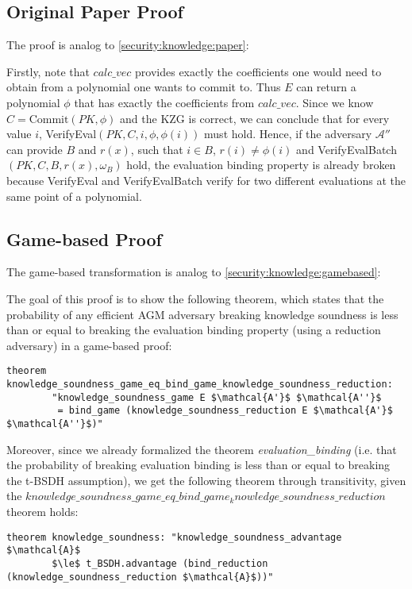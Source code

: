 \subsection*{Original Paper Proof}
\label{batch:security:knowledge:paper}
The proof is analog to \ref{security:knowledge:paper}:

Firstly, note that $calc\_vec$ provides exactly the coefficients one would need to obtain from a polynomial one wants to commit to. Thus $E$ can return a polynomial $\phi$ that has exactly the coefficients from $calc\_vec$. Since we know $C= \text{Commit}(PK, \phi)$ and the KZG is correct, we can conclude that for every value $i$, VerifyEval$(PK, C, i, \phi, \phi(i))$ must hold. Hence, if the adversary $\mathcal{A''}$ can provide $B$ and $r(x)$, such that $i\in B$, $r(i)\ne\phi(i)$
and VerifyEvalBatch$(PK, C, B, r(x), \omega_B)$ hold, the evaluation binding property is already broken because VerifyEval and VerifyEvalBatch verify for two different evaluations at the same point of a polynomial.

\subsection*{Game-based Proof}
\label{batch:security:knowledge:gamebased}

The game-based transformation is analog to \ref{security:knowledge:gamebased}:

The goal of this proof is to show the following theorem, which states that the probability of any efficient AGM adversary breaking  knowledge soundness is less than or equal to breaking the evaluation binding property (using a reduction adversary) in a game-based proof:
\begin{lstlisting}[language=isabelle]
    theorem knowledge_soundness_game_eq_bind_game_knowledge_soundness_reduction: 
        "knowledge_soundness_game E $\mathcal{A'}$ $\mathcal{A''}$ 
         = bind_game (knowledge_soundness_reduction E $\mathcal{A'}$ $\mathcal{A''}$)"
\end{lstlisting}
Moreover, since we already formalized the theorem \textit{evaluation\_binding} (i.e. that the probability of breaking evaluation binding is less than or equal to breaking the t-BSDH assumption), we get the following theorem through transitivity, given the $knowledge\_soundness\_game\_eq\_bind\_game_knowledge\_soundness\_reduction$ theorem holds: 

\begin{lstlisting}[language=isabelle]
    theorem knowledge_soundness: "knowledge_soundness_advantage $\mathcal{A}$ 
        $\le$ t_BSDH.advantage (bind_reduction (knowledge_soundness_reduction $\mathcal{A}$))"
\end{lstlisting}

